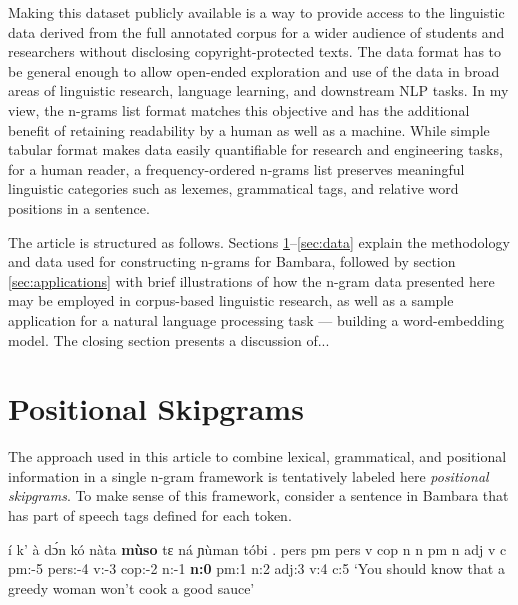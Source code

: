 \documentclass[12pt]{article}
\begin{document}
Making this dataset publicly available is a way to provide access to
the linguistic data derived from the full annotated corpus for a wider
audience of students and researchers without disclosing
copyright-protected texts. The data format has to be general enough to
allow open-ended exploration and use of the data in broad areas of
linguistic research, language learning, and downstream NLP tasks. In
my view, the n-grams list format matches this objective
and has the additional benefit of retaining readability by a human as
well as a machine. While simple tabular format makes data easily
quantifiable for research and engineering tasks, for a human reader, a
frequency-ordered n-grams list preserves meaningful linguistic
categories such as lexemes, grammatical tags, and relative word positions in
a sentence. %


The article is structured as follows. Sections
\ref{sec:definition}--\ref{sec:data} explain the methodology and data
used for constructing n-grams for Bambara, followed by section
\ref{sec:applications} with brief illustrations of how the
n-gram data presented here may be employed in corpus-based linguistic
research, as well as a sample application for a natural language
processing task — building a word-embedding model.  The closing
section presents a discussion of...


\section{Positional Skipgrams}
\label{sec:definition}

The approach used in this article to combine lexical, grammatical, and
positional information in a single n-gram framework is tentatively
labeled here \textit{positional skipgrams}.  To make sense of this
framework, consider a sentence in Bambara that has part of speech tags
defined for each token.

\begin{example}
  \label{ex:muso}
  \trigloss
  {í       k'      à       dɔ́n     kó      nàta    \textbf{mùso}    tɛ      ná      ɲùman   tóbi    .}
  {pers    pm      pers    v       cop     n       n       pm      n       adj     v       c}
  {{} pm:-5 pers:-4 v:-3 cop:-2 n:-1 \textbf{n:0} pm:1 n:2 adj:3 v:4 c:5}
  {‘You should know that a greedy woman won't cook a good sauce’}
\end{example}
\end{document}
